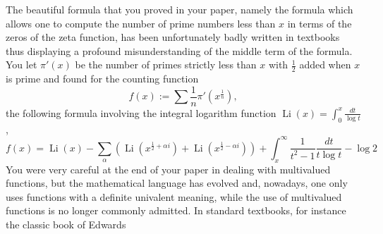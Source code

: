 \documentclass{article}
\begin{document}
 \begin{large}%
 
  \bigskip
 
 The beautiful formula that you proved in your paper, namely the formula which allows one to compute the number of prime numbers less than $x$ in terms of the zeros of the zeta function, has been unfortunately badly written in textbooks thus displaying a profound misunderstanding of the middle term of the formula.  You let 
  $\pi'(x)$ be the number of primes strictly less than $x$ with $\frac{1}{2}$ added when $x$ is prime and  found for the counting function 
$$
f(x):=\sum \frac{1}{n} \pi'\left(x^{\frac{1}{n}}\right),
$$
the following formula involving the integral logarithm function $\operatorname{Li}(x)=\int_0^x \frac{d t}{\log t}$,
\begin{equation}\label{piriemann}
f(x)=\operatorname{Li}(x)-\sum_\alpha\left(\operatorname{Li}\left(x^{\frac{1}{2}+\alpha i}\right)+\operatorname{Li}\left(x^{\frac{1}{2}-\alpha i}\right)\right)+\int_x^{\infty} \frac{1}{t^2-1} \frac{d t}{t \log t}-\log 2
 \end{equation}
 You were very careful at the end of your paper in dealing with multivalued functions, but the mathematical language has evolved and, nowadays, one only uses functions with  a definite univalent meaning, while the use of multivalued functions is no longer commonly admitted.\newline 
  In standard textbooks, for instance the classic book of Edwards
\end{large}
\end{document}
